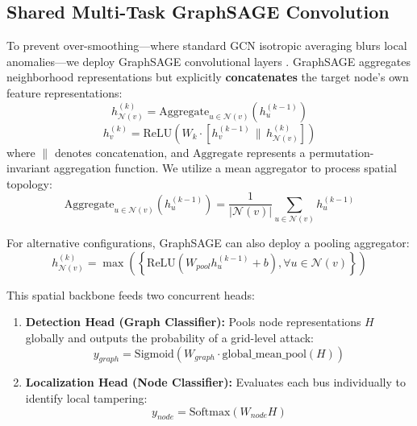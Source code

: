 \documentclass[journal]{IEEEtran}
\begin{document}
\subsection{Shared Multi-Task GraphSAGE Convolution}
To prevent over-smoothing—where standard GCN isotropic averaging blurs local anomalies—we deploy GraphSAGE convolutional layers \cite{b8}. GraphSAGE aggregates neighborhood representations but explicitly \textbf{concatenates} the target node's own feature representations:
\begin{equation}
h_{\mathcal{N}(v)}^{(k)} = \text{Aggregate}_{u \in \mathcal{N}(v)} \left( h_u^{(k-1)} \right)
\end{equation}
\begin{equation}
h_v^{(k)} = \text{ReLU} \left( W_k \cdot \left[ h_v^{(k-1)} \,\|\, h_{\mathcal{N}(v)}^{(k)} \right] \right)
\end{equation}
where $\|$ denotes concatenation, and $\text{Aggregate}$ represents a permutation-invariant aggregation function. We utilize a mean aggregator to process spatial topology:
\begin{equation}
\text{Aggregate}_{u \in \mathcal{N}(v)} \left( h_u^{(k-1)} \right) = \frac{1}{|\mathcal{N}(v)|} \sum_{u \in \mathcal{N}(v)} h_u^{(k-1)}
\end{equation}

For alternative configurations, GraphSAGE can also deploy a pooling aggregator:
\begin{equation}
h_{\mathcal{N}(v)}^{(k)} = \max \left( \left\{ \text{ReLU}\left( W_{pool} h_u^{(k-1)} + b \right), \forall u \in \mathcal{N}(v) \right\} \right)
\end{equation}

This spatial backbone feeds two concurrent heads:
\begin{enumerate}
    \item \textbf{Detection Head (Graph Classifier):} Pools node representations $H$ globally and outputs the probability of a grid-level attack:
    \begin{equation}
    y_{graph} = \text{Sigmoid}\left(W_{graph} \cdot \text{global\_mean\_pool}(H)\right)
    \end{equation}
    \item \textbf{Localization Head (Node Classifier):} Evaluates each bus individually to identify local tampering:
    \begin{equation}
    y_{node} = \text{Softmax}(W_{node} H)
    \end{equation}
\end{enumerate}
\end{document}
